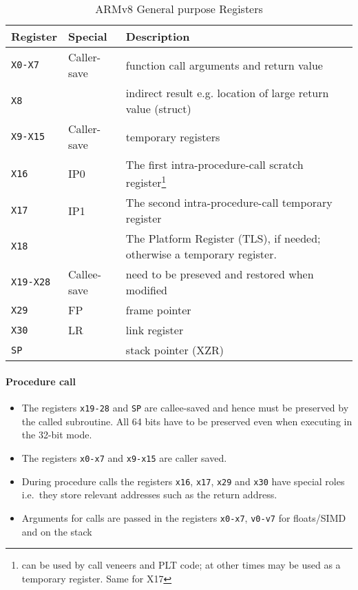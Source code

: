 \documentclass[a4paper,twoside]{report}
\begin{document}
\begin{table}[!h]
    \begin{center}

    \begin{tabular}{lll}
        \textbf{Register} & \textbf{Special} & \textbf{Description} \\
        \hline
        \texttt{X0-X7}   & Caller-save & function call arguments and return value 
        \\
        \texttt{X8}      & & indirect result e.g. location of large return value 
                             (struct) \\
        \texttt{X9-X15}  & Caller-save& temporary registers  \\
        \texttt{X16}     & IP0 & The first intra-procedure-call scratch 
        register\footnote{can be used by call veneers and PLT code; at other 
        times may be used as a temporary register. Same for X17}\\
        \texttt{X17}     & IP1 & The second intra-procedure-call temporary 
        register  \\
        \texttt{X18}     & & The Platform Register (TLS), if needed; otherwise a 
        temporary register. \\
        \texttt{X19-X28} & Callee-save & need to be preseved and restored when 
                           modified\\
        \texttt{X29}     & FP & frame pointer \\
        \texttt{X30}     & LR & link register \\
        \texttt{SP}      & & stack pointer (XZR) \\
        
    \end{tabular}
    \caption{ARMv8 General purpose Registers}
    \label{tab:registers}
        \end{center}
\end{table}

\paragraph{Procedure call}
\begin{itemize}
    \item The registers \texttt{x19-28} and \texttt{SP} are callee-saved and 
          hence must be preserved by the called subroutine. All 64 bits have to 
          be preserved even when executing in the 32-bit mode.
    \item The registers \texttt{x0-x7} and \texttt{x9-x15} are caller saved.
    \item During procedure calls the registers \texttt{x16}, \texttt{x17}, 
          \texttt{x29} and \texttt{x30} have special roles i.e.\ they store 
          relevant addresses such as the return address.
    \item Arguments for calls are passed in the registers \texttt{x0-x7}, 	    
          \texttt{v0-v7} for floats/SIMD and on the stack
\end{itemize}
\end{document}
